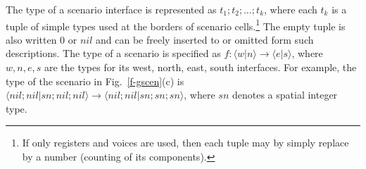 \documentclass[runningheads]{llncs}
\newcommand{\1}{\u{a}}
\newcommand{\2}{\c{s}}
\newcommand{\5}{\c{t}}
\newcommand{\8}{\^{\i}}
\newcommand{\9}{\^{a}}
\newcommand{\hsp}{\hspace{2ex}}
\newcommand{\snvsp}{\vspace{-1ex}}
\newcommand{\foo}[1]{\footnote{#1}}
\newcommand{\ra}{\rightarrow}
\newcommand{\tdwbis}[2]{\raisebox{3pt}{
\begin{#1}\begin{tt}\begin{tabular}[t]{c}#2\end{tabular}\end{tt}\end{#1}}}
\newcommand{\tdret}{\snvsp\\}
\newcommand{\scelli}[5]{\begin{picture}(0,0)(0,0)\put(-12,52){\parbox[t]{20mm}{\begin{center}#1\end{center}}}
  \put(-28,35){\parbox[t]{20mm}{\begin{center}#2\end{center}}}\put(16,16){\makebox(0,0){#3}}
  \put(5,35){\parbox[t]{20mm}{\begin{center}#4\end{center}}}
  \put(-12,18){\parbox[t]{20mm}{\begin{center}#5\end{center}}}
  \end{picture}\texttt{[image: fig/scen01.eps]}}
\newcommand{\tsrv}[4]{\langle #1|#2\rangle\ra\langle #3|#4\rangle}
\begin{document}

The type of a scenario interface is represented as $t_1;t_2;\dots;t_k$, where each $t_k$ is a tuple of simple
types used at the borders of scenario cells.\foo{If only registers and voices are used, then each tuple may by
  simply replace by a number (counting of its components).} The empty tuple is also written 0 or $nil$ and can
be freely inserted to or omitted form such descriptions. The type of a scenario is specified as
$f:\tsrv{w}{n}{e}{s}$, where $w,n,e,s$ are the types for its west, north, east, south interfaces.  For
example, the type of the scenario in Fig.~\ref{f-gscen}(c) is $\tsrv{nil;nil}{sn;nil;nil}
{nil;nil}{sn;sn;sn}$, where $sn$ denotes a spatial integer type.
\end{document}
